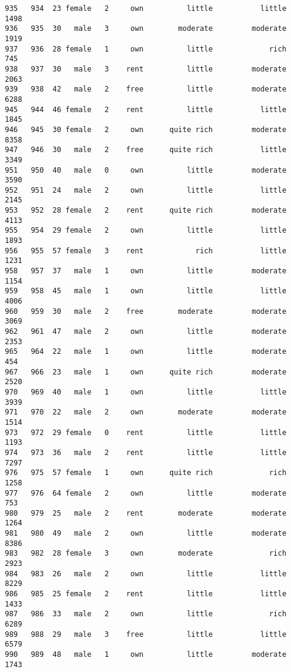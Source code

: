 \documentclass[
]{article}
\begin{document}
\begin{verbatim}
935   934  23 female   2     own          little           little          1498
936   935  30   male   3     own        moderate         moderate          1919
937   936  28 female   1     own          little             rich           745
938   937  30   male   3    rent          little         moderate          2063
939   938  42   male   2    free          little         moderate          6288
945   944  46 female   2    rent          little           little          1845
946   945  30 female   2     own      quite rich         moderate          8358
947   946  30   male   2    free      quite rich           little          3349
951   950  40   male   0     own          little         moderate          3590
952   951  24   male   2     own          little           little          2145
953   952  28 female   2    rent      quite rich         moderate          4113
955   954  29 female   2     own          little           little          1893
956   955  57 female   3    rent            rich           little          1231
958   957  37   male   1     own          little         moderate          1154
959   958  45   male   1     own          little           little          4006
960   959  30   male   2    free        moderate         moderate          3069
962   961  47   male   2     own          little         moderate          2353
965   964  22   male   1     own          little         moderate           454
967   966  23   male   1     own      quite rich         moderate          2520
970   969  40   male   1     own          little           little          3939
971   970  22   male   2     own        moderate         moderate          1514
973   972  29 female   0    rent          little           little          1193
974   973  36   male   2    rent          little           little          7297
976   975  57 female   1     own      quite rich             rich          1258
977   976  64 female   2     own          little         moderate           753
980   979  25   male   2    rent        moderate         moderate          1264
981   980  49   male   2     own          little         moderate          8386
983   982  28 female   3     own        moderate             rich          2923
984   983  26   male   2     own          little           little          8229
986   985  25 female   2    rent          little           little          1433
987   986  33   male   2     own          little             rich          6289
989   988  29   male   3    free          little           little          6579
990   989  48   male   1     own          little         moderate          1743

\end{verbatim}
\end{document}
